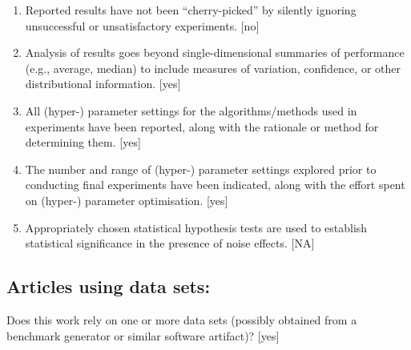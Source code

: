 \documentclass[]{jair}
\begin{document}
\begin{enumerate}
    [yes]
    \item 
    Reported results have not been ``cherry-picked'' by silently ignoring unsuccessful or unsatisfactory experiments. 
    [no]
    \item 
    Analysis of results goes beyond single-dimensional summaries of performance (e.g., average, median) to include measures of variation, confidence, or other distributional information. 
    [yes]
    \item %
    All (hyper-) parameter settings for 
    the algorithms/methods used in experiments have been reported, along with the rationale or method for determining them. 
    [yes]
    \item %
    The number and range of (hyper-) parameter settings explored prior to conducting final experiments have been indicated, along with the effort spent on (hyper-) parameter optimisation. 
    [yes]
    \item %
    Appropriately chosen statistical hypothesis tests are used to establish statistical significance
    in the presence of noise effects.
    [NA]
\end{enumerate}


\subsection*{Articles using data sets:}
Does this work rely on one or more data sets (possibly obtained from a benchmark generator or similar software artifact)? 
[yes]
\end{document}
